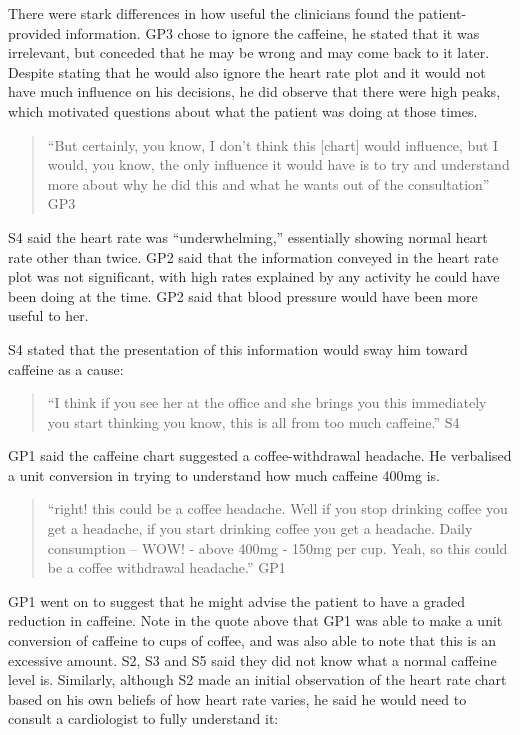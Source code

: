 \documentclass{sigchi}
\begin{document}

There were stark differences in how useful the clinicians found the patient-provided information. GP3 chose to ignore the caffeine, he stated that it was irrelevant, but conceded that he may be wrong and may come back to it later. Despite stating that he would also ignore the heart rate plot and it would not have much influence on his decisions, he did observe that there were high peaks, which motivated questions about what the patient was doing at those times. 

\begin{quote}
    ``But certainly, you know, I don't think this [chart] would influence, but I would, you know, the only influence it would have is to try and understand more about why he did this and what he wants out of the consultation'' GP3
\end{quote}

S4 said the heart rate was ``underwhelming,'' essentially showing normal heart rate other than twice. GP2 said that the information conveyed in the heart rate plot was not significant, with high rates explained by any activity he could have been doing at the time. GP2 said that blood pressure would have been more useful to her.

S4 stated that the presentation of this information would sway him toward caffeine as a cause:

\begin{quote}
    ``I think if you see her at the office and she brings you this immediately you start thinking you know, this is all from too much caffeine.'' S4
\end{quote}

GP1 said the caffeine chart suggested a coffee-withdrawal headache. He verbalised a unit conversion in trying to understand how much caffeine 400mg is.

\begin{quote}
    ``right! this could be a coffee headache. Well if you stop drinking coffee you get a headache, if you start drinking coffee you get a headache. Daily consumption -- WOW! - above 400mg - 150mg per cup. Yeah, so this could be a coffee withdrawal headache.'' GP1
\end{quote}

GP1 went on to suggest that he might advise the patient to have a graded reduction in caffeine. Note in the quote above that GP1 was able to make a unit conversion of caffeine to cups of coffee, and was also able to note that this is an excessive amount. S2, S3 and S5 said they did not know what a normal caffeine level is. Similarly, although S2 made an initial observation of the heart rate chart based on his own beliefs of how heart rate varies, he said he would need to consult a cardiologist to fully understand it:
\end{document}
